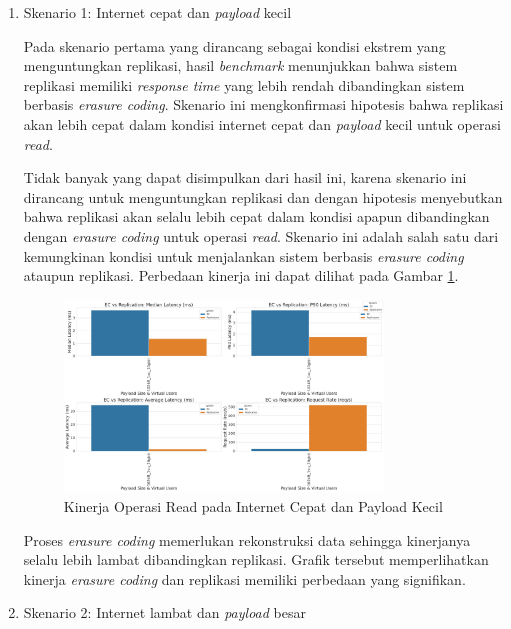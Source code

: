 \begin{enumerate}
	\item Skenario 1: Internet cepat dan \textit{payload} kecil

	      Pada skenario pertama yang dirancang sebagai kondisi ekstrem yang menguntungkan replikasi, hasil \textit{benchmark} menunjukkan bahwa sistem replikasi memiliki \textit{response time} yang lebih rendah dibandingkan sistem berbasis \textit{erasure coding}. Skenario ini mengkonfirmasi hipotesis bahwa replikasi akan lebih cepat dalam kondisi internet cepat dan \textit{payload} kecil untuk operasi \textit{read}.

	      Tidak banyak yang dapat disimpulkan dari hasil ini, karena skenario ini dirancang untuk menguntungkan replikasi dan dengan hipotesis menyebutkan bahwa replikasi akan selalu lebih cepat dalam kondisi apapun dibandingkan dengan \textit{erasure coding} untuk operasi \textit{read}. Skenario ini adalah salah satu dari kemungkinan kondisi untuk menjalankan sistem berbasis \textit{erasure coding} ataupun replikasi. Perbedaan kinerja ini dapat dilihat pada Gambar \ref{fig:read-smload-fastnet}.

	      \begin{figure}[ht]
		      \centering
		      \includegraphics[width=0.8\textwidth]{resources/chapter-4/read_smload_fastnet.png}

		      \caption{Kinerja Operasi Read pada Internet Cepat dan Payload Kecil}
		      \label{fig:read-smload-fastnet}
	      \end{figure}

	      Proses \textit{erasure coding} memerlukan rekonstruksi data sehingga kinerjanya selalu lebih lambat dibandingkan replikasi. Grafik tersebut memperlihatkan kinerja \textit{erasure coding} dan replikasi memiliki perbedaan yang signifikan.

	\item Skenario 2: Internet lambat dan \textit{payload} besar


\end{enumerate}
